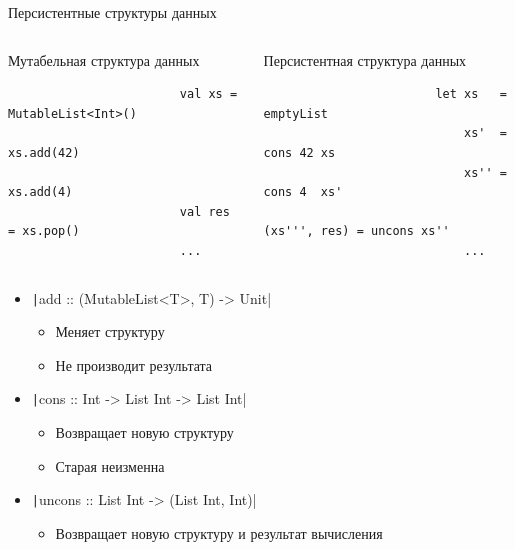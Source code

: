    \begin{frame}[fragile]{Персистентные структуры данных}
        \vspace{-0.5em}
        \vspace{-1em}
        \begin{columns}[onlytextwidth]
            \pause
            \begin{column}[t]{0.485\textwidth}
                \begin{block}{Мутабельная структура данных}
                    \begin{verbatim}
                        val xs = MutableList<Int>()
                        xs.add(42)
                        xs.add(4)
                        val res = xs.pop()
                        ...
                    \end{verbatim}
                \end{block}
            \end{column}\hfill%
            \pause
            \begin{column}[t]{0.485\textwidth}
                \begin{block}{Персистентная структура данных}
                    \begin{verbatim}
                        let xs   = emptyList
                            xs'  = cons 42 xs
                            xs'' = cons 4  xs'
                            (xs''', res) = uncons xs''
                            ...
                    \end{verbatim}
                \end{block}
            \end{column}
        \end{columns}
        \vspace{0.5em}
        \begin{itemize}
            \item \texttt|add :: (MutableList<T>, T) -> Unit|
            \begin{itemize}
                \item Меняет структуру
                \item Не производит результата
            \end{itemize}
            \item \texttt|cons :: Int -> List Int -> List Int|
            \begin{itemize}
                \item Возвращает новую структуру
                \item Старая неизменна
            \end{itemize}
            \item \texttt|uncons :: List Int -> (List Int, Int)|
            \begin{itemize}
                \item Возвращает новую структуру и результат вычисления
            \end{itemize}
        \end{itemize}
    \end{frame}

